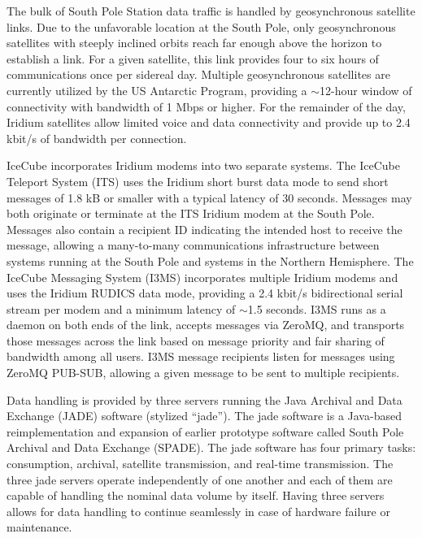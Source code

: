 The bulk of South Pole Station data traffic is handled by geosynchronous satellite links.  Due to the unfavorable
location at the South Pole, only geosynchronous satellites with steeply inclined orbits reach far enough above the
horizon to establish a link.  For a given satellite, this link provides four to six hours of communications once per
sidereal day.  Multiple geosynchronous satellites are currently
utilized by the US Antarctic Program, providing a $\sim$12-hour window
of connectivity with bandwidth of 1 Mbps or higher.  For the remainder of the day, Iridium satellites allow
limited voice and data connectivity and provide up to 2.4 kbit/s of bandwidth per connection.

IceCube incorporates Iridium modems into two separate systems.  The IceCube Teleport System (ITS) uses the Iridium short burst
data mode to send short messages of 1.8 kB or smaller with a typical latency of 30 seconds.  Messages may both originate or terminate
at the ITS Iridium modem at the South Pole.  Messages also contain a recipient ID indicating the intended host to receive
the message, allowing a many-to-many communications infrastructure between systems running at the South Pole and systems
in the Northern Hemisphere.  The IceCube Messaging System (I3MS) incorporates multiple Iridium modems and uses the Iridium RUDICS
data mode, providing a 2.4 kbit/s bidirectional serial stream per modem and a minimum latency of $\sim$1.5 seconds.
I3MS runs as a daemon on both ends of the link, accepts messages via ZeroMQ, and transports those messages across the link
based on message priority and fair sharing of bandwidth among all users.  I3MS message recipients listen for messages
using ZeroMQ PUB-SUB, allowing a given message to be sent to multiple recipients.


Data handling is provided by three servers running the Java Archival and Data Exchange (JADE) software (stylized “jade”). 
The jade software is a Java-based reimplementation and expansion of earlier prototype software called South Pole Archival
and Data Exchange (SPADE). The jade software has four primary tasks: consumption, archival, satellite transmission, and real-time
transmission. The three jade servers operate independently of one another and
each of them are capable of handling the nominal data volume by itself. Having three servers allows for data handling to continue seamlessly
in case of hardware failure or maintenance.


